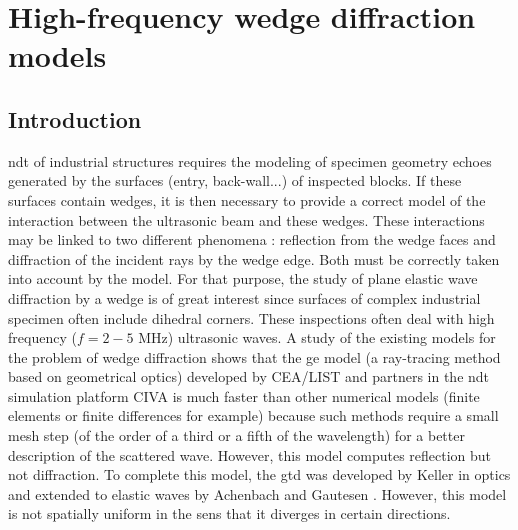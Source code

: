 \chapter[][State of the Art]{High-frequency wedge diffraction models}
\label{chap-biblio}

\section*{Introduction}
\acrfull{ndt} of industrial structures requires the modeling of specimen geometry echoes generated by the surfaces (entry, back-wall...) of inspected blocks. If these surfaces contain wedges, it is then necessary to provide a correct model of the interaction between the ultrasonic beam and these wedges. These interactions may be linked to two different phenomena : reflection from the wedge faces and diffraction of the incident rays by the wedge edge. Both must be correctly taken into account by the model. For that purpose, the study of plane elastic wave diffraction by a wedge is of great interest since surfaces of complex industrial specimen often include dihedral corners.
These inspections often deal with high frequency ($f=2-5$ MHz) ultrasonic waves. A study of the existing models for the problem of wedge diffraction shows that the \acrfull{ge} model (a ray-tracing method based on geometrical optics) developed by CEA/LIST and partners in the \acrshort{ndt} simulation platform CIVA \cite{Darmonspec} is much faster than other numerical models (finite elements or finite differences for example) because such methods require a small mesh step (of the order of a third or a fifth of the wavelength) for a better description of the scattered wave. However, this model computes reflection but not diffraction. To complete this model, the \acrfull{gtd} was developed by Keller \cite{GTD} in optics and extended to elastic waves by Achenbach and Gautesen \cite{AchenbachGautesen, Achenbach}. However, this model is not spatially uniform in the sens that it diverges in certain directions. 

